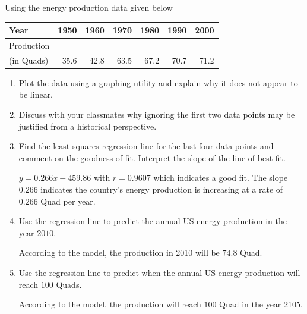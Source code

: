 \documentclass{ximera}
\begin{document}
\begin{problem}
Using the energy production data given below

\begin{tabular}{|l|r|r|r|r|r|r|} \hline
Year & 1950 & 1960 & 1970 & 1980 & 1990 & 2000 \\
\hline
Production & & & & & & \\
(in Quads) & 35.6 & 42.8 & 63.5 & 67.2 & 70.7 & 71.2 \\ \hline
\end{tabular}

\begin{enumerate}

\item  Plot the data using a graphing utility and explain why it does not appear to be linear.

\item  Discuss with your classmates why ignoring the first two data points may be justified from a historical perspective.

\item Find the least squares regression line for the last four data points and comment on the goodness of fit. Interpret the slope of the line of best fit.

\begin{solution}
$y = 0.266x - 459.86$ with $r = 0.9607$ which indicates a good fit.  The slope $0.266$ indicates the country's energy production is increasing at a rate of $0.266$ Quad per year.
\end{solution}

\item  Use the regression line to predict the annual US energy production in the year $2010$.

\begin{solution}
According to the model, the production in 2010 will be $74.8$ Quad.
\end{solution}

\item  Use the regression line to predict when the annual US energy production will reach $100$ Quads.

\begin{solution}
According to the model, the production will reach $100$ Quad in the year 2105.
\end{solution}
\end{enumerate}
\end{problem}
\end{document}
